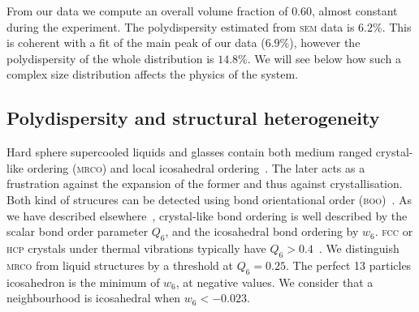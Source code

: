 \documentclass[8.5pt,twoside,twocolumn]{article}
\begin{document}
From our data we compute an overall volume fraction of $0.60$, almost constant during the experiment. The polydispersity estimated from \textsc{sem} data is $6.2\%$. This is coherent with a fit of the main peak of our data ($6.9\%$), however the polydispersity of the whole distribution is $14.8\%$. We will see below how such a complex size distribution affects the physics of the system.



\subsection{Polydispersity and structural heterogeneity}

Hard sphere supercooled liquids and glasses contain both medium ranged crystal-like ordering (\textsc{mrco}) and local icosahedral ordering~\cite{Leocmach2012}. The later acts as a frustration against the expansion of the former and thus against crystallisation. Both kind of strucures can be detected using bond orientational order (\textsc{boo})~\citet{steinhardt1983boo}. As we have described elsewhere~\cite{Leocmach2012}, crystal-like bond ordering is well described by the scalar bond order parameter $Q_6$, and the icosahedral bond ordering by $w_6$. \textsc{fcc} or \textsc{hcp} crystals under thermal vibrations typically have $Q_6>0.4$~\cite{Lechner2008}. We distinguish \textsc{mrco} from liquid structures by a threshold at $Q_6=0.25$. The perfect 13 particles icosahedron is the minimum of $w_6$, at negative values. We consider that a neighbourhood is icosahedral when $w_6<-0.023$.
\end{document}
